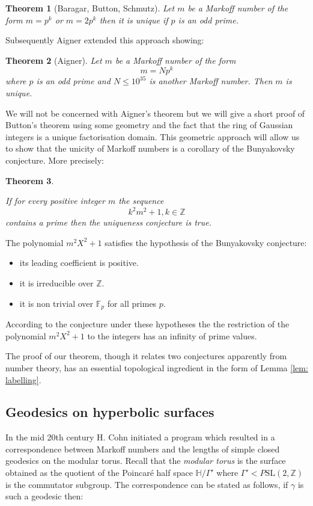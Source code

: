 \documentclass[12pt,a4paper]{amsart}
\newtheorem{thm}{Theorem}[section]
\def\HH{\mathbb{H}}
\def\ZZ{\mathbb{Z}}
\def\sl2{\mathrm{SL}(2, \ZZ)}
\begin{document}
 \begin{thm}[Baragar, Button, Schmutz] \label{button}
 Let $m$ be a Markoff number of the form 
 $m=p^k$ or $m=2p^k$ then it is unique
if $p$ is an odd prime.
 \end{thm}

Subsequently Aigner extended  this approach showing:
 
 \begin{thm}[Aigner]
 Let $m$ be a Markoff number of the form 
 $$m =Np^k$$
 where $p$ is an odd prime and $N \leq 10^{35}$ is another Markoff number. Then $m$ is unique.
 \end{thm}

We will not be concerned with Aigner's theorem but we will give a short proof
of Button's theorem using some geometry and the fact that the ring of Gaussian
integers is a unique factorisation domain. This geometric approach will allow
us to show that the unicity of Markoff numbers is a corollary of the
Bunyakovsky conjecture. More precisely:

\begin{thm}\label{main}

If for every positive integer $m$ the sequence $$k^2m^2 + 1, k \in \ZZ$$ contains a
prime then the uniqueness conjecture is true.

\end{thm}

The polynomial $m^2 X^2 + 1$ satisfies the hypothesis of the Bunyakovsky conjecture:
\begin{itemize}
\item its leading coefficient is positive.
\item it is irreducible over $\ZZ$.
\item it is non trivial over $\mathbb{F}_p$ for all primes $p$.
\end{itemize}

According to the conjecture under these hypotheses the the restriction of the
polynomial  $m^2 X^2 + 1$ to the integers has an infinity of prime values.

The proof of our theorem, though it relates two conjectures apparently from
number theory, has an essential topological ingredient in the form of Lemma
\ref{lem: labelling}.


\subsection{Geodesics on hyperbolic surfaces} In the mid 20th century H. Cohn
initiated a program which resulted in a correspondence between Markoff numbers
and the lengths of simple closed geodesics on the modular torus. Recall that
the \textit{modular torus} is the surface obtained as the quotient of the
Poincar\'e half space $\HH/\Gamma'$ where $\Gamma' < P\sl2$ is the commutator
subgroup. The correspondence can be stated as follows, if $\gamma$ is such a
geodesic then: 
\end{document}
